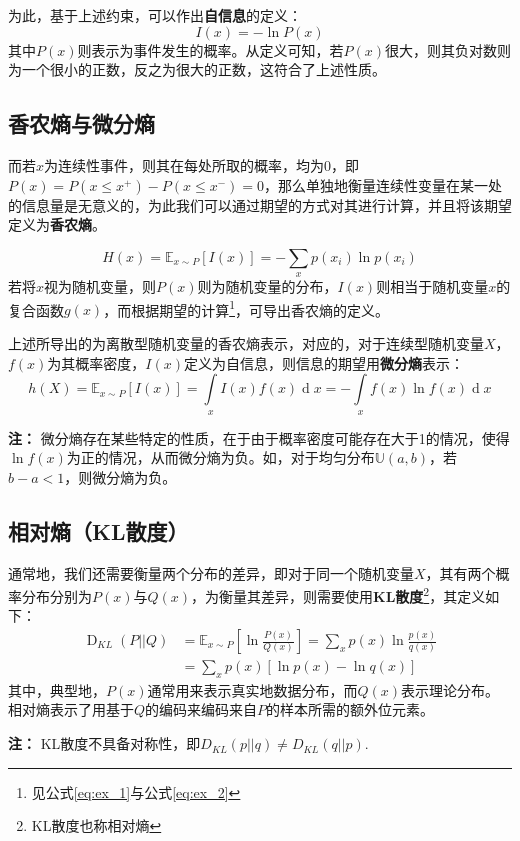 \documentclass[12pt,a4paper]{article}
\begin{document}
  为此，基于上述约束，可以作出\textbf{自信息}的定义：
  $$
  I(x) = -\ln P(x)
  $$
  其中$P(x)$则表示为事件发生的概率。从定义可知，若$P(x)$很大，则其负对数则为一个很小的正数，反之为很大的正数，这符合了上述性质。

  \subsection{香农熵与微分熵}

  而若$x$为连续性事件，则其在每处所取的概率，均为0，即$P(x)=P(x\leq x^+)-P(x\leq x^-)=0$，那么单独地衡量连续性变量在某一处的信息量是无意义的，为此我们可以通过期望的方式对其进行计算，并且将该期望定义为\textbf{香农熵}。

  $$
  H(x) = \mathbb{E}_{x\sim P}[I(x)]=-\sum_{x} p(x_i)\ln p(x_i)
  $$
  若将$x$视为随机变量，则$P(x)$则为随机变量的分布，$I(x)$则相当于随机变量$x$的复合函数$g(x)$，而根据期望的计算\footnote{见公式\eqref{eq:ex_1}与公式\eqref{eq:ex_2}}，可导出香农熵的定义。

  上述所导出的为离散型随机变量的香农熵表示，对应的，对于连续型随机变量$X$，$f(x)$为其概率密度，$I(x)$定义为自信息，则信息的期望用\textbf{微分熵}表示：
  $$
  h(X) = \mathbb{E}_{x \sim P}[I(x)] = \int\limits_x I(x)f(x) \operatorname{d}x = -\int\limits_x f(x) \ln f(x) \operatorname{d}x
  $$

  \textbf{注：} 微分熵存在某些特定的性质，在于由于概率密度可能存在大于1的情况，使得$\ln f(x)$为正的情况，从而微分熵为负。如，对于均匀分布$\mathbb{U}(a, b)$，若$b-a < 1$，则微分熵为负。

  \subsection{相对熵（KL散度）}
  通常地，我们还需要衡量两个分布的差异，即对于同一个随机变量$X$，其有两个概率分布分别为$P(x)$与$Q(x)$，为衡量其差异，则需要使用\textbf{KL散度}\footnote{KL散度也称相对熵}，其定义如下：
  $$
  \begin{aligned}
    \operatorname{D}_{KL}(P||Q) &= \mathbb{E}_{x \sim P}\left[\ln \frac{P(x)}{Q(x)}\right] = \sum\limits_x p(x) \ln \frac{p(x)}{q(x)}  \\ 
    & = \sum\limits_x p(x) [\ln p(x) - \ln q(x)]
  \end{aligned}
  $$
  其中，典型地，$P(x)$通常用来表示真实地数据分布，而$Q(x)$表示理论分布。相对熵表示了用基于$Q$的编码来编码来自$P$的样本所需的额外位元素。

  \textbf{注：} KL散度不具备对称性，即$D_{KL}(p||q) \neq D_{KL} (q||p)$. 
\end{document}
